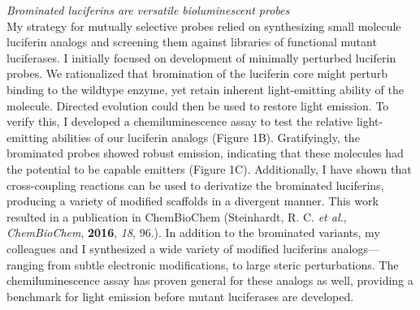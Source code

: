 \documentclass{F32}
\begin{document}
\textit{Brominated luciferins are versatile bioluminescent probes}\\
My strategy for mutually selective probes relied on synthesizing small molecule luciferin analogs and screening them against libraries of functional mutant luciferases. I initially focused on development of minimally perturbed luciferin probes. We rationalized that bromination of the luciferin core might perturb binding to the wildtype enzyme, yet retain inherent light-emitting ability of the molecule. Directed evolution could then be used to restore light emission. To verify this, I developed a chemiluminescence assay to test the relative light-emitting abilities of our luciferin analogs (Figure 1B). Gratifyingly, the brominated probes showed robust emission, indicating that these molecules had the potential to be capable emitters (Figure 1C). Additionally, I have shown that cross-coupling reactions can be used to derivatize the brominated luciferins, producing a variety of modified scaffolds in a divergent manner. This work resulted in a publication in ChemBioChem (Steinhardt, R. C. \textit{et al.}, \textit{ChemBioChem}, \textbf{2016}, \textit{18}, 96.). In addition to the brominated variants, my colleagues and I synthesized a wide variety of modified luciferins analogs—ranging from subtle electronic modifications, to large steric perturbations. The chemiluminescence assay has proven general for these analogs as well, providing a benchmark for light emission before mutant luciferases are developed.
\end{document}
